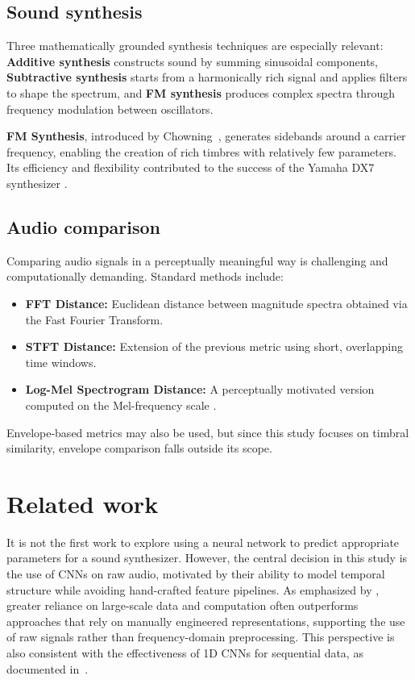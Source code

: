 \documentclass[10pt,conference]{IEEEtran}
\begin{document}
\subsection{Sound synthesis}

Three mathematically grounded synthesis techniques are especially relevant: \textbf{Additive synthesis} constructs sound by summing sinusoidal components, \textbf{Subtractive synthesis} starts from a harmonically rich signal and applies filters to shape the spectrum, and \textbf{FM synthesis} produces complex spectra through frequency modulation between oscillators.

\textbf{FM Synthesis}, introduced by Chowning~\cite{chowning1973synthesis}, generates sidebands around a carrier frequency, enabling the creation of rich timbres with relatively few parameters. Its efficiency and flexibility contributed to the success of the Yamaha DX7 synthesizer \cite{steinmetz2022ddx7, lazzarini2023higherorder}.

\subsection{Audio comparison}

Comparing audio signals in a perceptually meaningful way is challenging and computationally demanding. Standard methods \cite{claesson2021resynthesis} include:

\begin{itemize}
    \item \textbf{FFT Distance:} Euclidean distance between magnitude spectra obtained via the Fast Fourier Transform.
    \item \textbf{STFT Distance:} Extension of the previous metric using short, overlapping time windows.
    \item \textbf{Log-Mel Spectrogram Distance:} A perceptually motivated version computed on the Mel-frequency scale \cite{claesson2021resynthesis,chulev2024improving}.
\end{itemize}

Envelope-based metrics may also be used, but since this study focuses on timbral similarity, envelope comparison falls outside its scope.

\section{Related work} \label{sec:related}

It is not the first work to explore using a neural network to predict appropriate parameters for a sound synthesizer. However, the central decision in this study is the use of CNNs on raw audio, motivated by their ability to model temporal structure while avoiding hand-crafted feature pipelines. As emphasized by \cite{sutton2019bitterlesson}, greater reliance on large-scale data and computation often outperforms approaches that rely on manually engineered representations, supporting the use of raw signals rather than frequency-domain preprocessing. This perspective is also consistent with the effectiveness of 1D CNNs for sequential data, as documented in~\cite {kiranyaz2021survey}.
\end{document}
